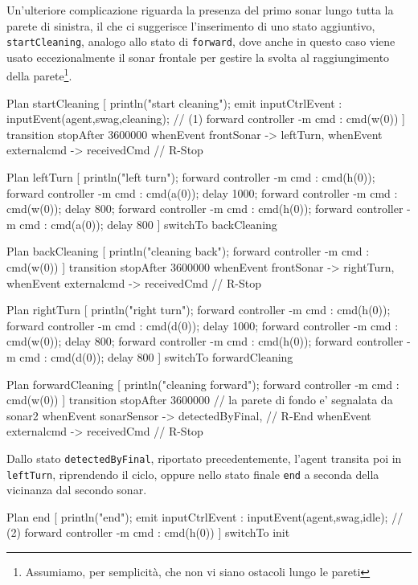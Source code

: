 \documentclass{../llncs}
\newcommand{\codescript}[1]{{\mbox{\small{\texttt{#1}}}}\xspace}
\begin{document}
Un'ulteriore complicazione riguarda la presenza del primo sonar lungo tutta la parete di sinistra, il che ci suggerisce l'inserimento di uno stato aggiuntivo, \texttt{startCleaning}, analogo allo stato di \texttt{forward}, dove anche in questo caso viene usato eccezionalmente il sonar frontale per gestire la svolta al raggiungimento della parete\footnote{Assumiamo, per semplicità, che non vi siano ostacoli lungo le pareti}.\\

\begin{qacode}[caption={SoftwareAgent, pt5}]
Plan startCleaning [
	println("start cleaning");
	emit inputCtrlEvent : inputEvent(agent,swag,cleaning); // (1)
	forward controller -m cmd : cmd(w(0))
]
transition stopAfter 3600000
	whenEvent frontSonar -> leftTurn,
	whenEvent externalcmd -> receivedCmd // R-Stop
	
Plan leftTurn [
	println("left turn");	
	forward controller -m cmd : cmd(h(0));
	forward controller -m cmd : cmd(a(0));
	delay 1000;
	forward controller -m cmd : cmd(w(0));
	delay 800;
	forward controller -m cmd : cmd(h(0));
	forward controller -m cmd : cmd(a(0));
	delay 800
]
switchTo backCleaning

Plan backCleaning [
	println("cleaning back");
	forward controller -m cmd : cmd(w(0))
]
transition stopAfter 3600000
	whenEvent frontSonar -> rightTurn,
	whenEvent externalcmd -> receivedCmd // R-Stop
	
Plan rightTurn [
	println("right turn");
	forward controller -m cmd : cmd(h(0));
	forward controller -m cmd : cmd(d(0));
	delay 1000;
	forward controller -m cmd : cmd(w(0));
	delay 800;
	forward controller -m cmd : cmd(h(0));
	forward controller -m cmd : cmd(d(0));
	delay 800
]
switchTo forwardCleaning

Plan forwardCleaning [
	println("cleaning forward");
	forward controller -m cmd : cmd(w(0))
]
transition stopAfter 3600000
	// la parete di fondo e' segnalata da sonar2
	whenEvent sonarSensor -> detectedByFinal, // R-End
	whenEvent externalcmd -> receivedCmd // R-Stop
\end{qacode}

Dallo stato \codescript{detectedByFinal}, riportato precedentemente, l'agent transita poi in \codescript{leftTurn}, riprendendo il ciclo, oppure nello stato finale \codescript{end} a seconda della vicinanza dal secondo sonar.\\

\begin{qacode}[caption={SoftwareAgent, pt6}]
Plan end [
	println("end");
	emit inputCtrlEvent : inputEvent(agent,swag,idle); // (2)
	forward controller -m cmd : cmd(h(0))
]
switchTo init
\end{qacode}
\end{document}
